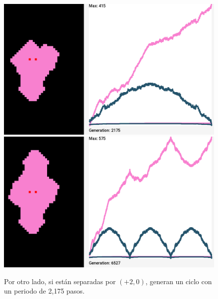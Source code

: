 \documentclass[12pt,twoside]{article}
\begin{document}
\begin{figure}[h!]
	\centering

	\begin{minipage}{0.45\textwidth}
		\centering
		\includegraphics[width=\textwidth]{img/2_rl_1.png}
	\end{minipage}%
	\hspace{0.5cm}%
	\begin{minipage}{0.45\textwidth}
		\centering
		\includegraphics[width=\textwidth]{img/2_rl_2.png}
	\end{minipage}
	\vspace{0.3cm}
	
	\begin{minipage}{0.9\textwidth}
		\centering
		\small Por otro lado, si están separadas por $(+2, 0)$, generan un ciclo con un periodo de 2,175 pasos.  
	\end{minipage}
	\vspace{0.5cm}
	

\end{figure}
\end{document}
